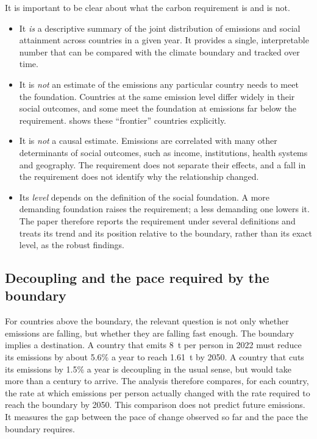 It is important to be clear about what the carbon requirement is and is not.
\begin{itemize}
\item It \emph{is} a descriptive summary of the joint distribution of emissions and social attainment across countries in a given year. It provides a single, interpretable number that can be compared with the climate boundary and tracked over time.
\item It is \emph{not} an estimate of the emissions any particular country needs to meet the foundation. Countries at the same emission level differ widely in their social outcomes, and some meet the foundation at emissions far below the requirement.  shows these ``frontier'' countries explicitly.
\item It is \emph{not} a causal estimate. Emissions are correlated with many other determinants of social outcomes, such as income, institutions, health systems and geography. The requirement does not separate their effects, and a fall in the requirement does not identify why the relationship changed.
\item Its \emph{level} depends on the definition of the social foundation. A more demanding foundation raises the requirement; a less demanding one lowers it. The paper therefore reports the requirement under several definitions and treats its trend and its position relative to the boundary, rather than its exact level, as the robust findings.
\end{itemize}

\subsection{Decoupling and the pace required by the boundary}

For countries above the boundary, the relevant question is not only whether emissions are falling, but whether they are falling fast enough. The boundary implies a destination. A country that emits 8~t per person in 2022 must reduce its emissions by about 5.6\% a year to reach 1.61~t by 2050. A country that cuts its emissions by 1.5\% a year is decoupling in the usual sense, but would take more than a century to arrive. The analysis therefore compares, for each country, the rate at which emissions per person actually changed with the rate required to reach the boundary by 2050. This comparison does not predict future emissions. It measures the gap between the pace of change observed so far and the pace the boundary requires.

